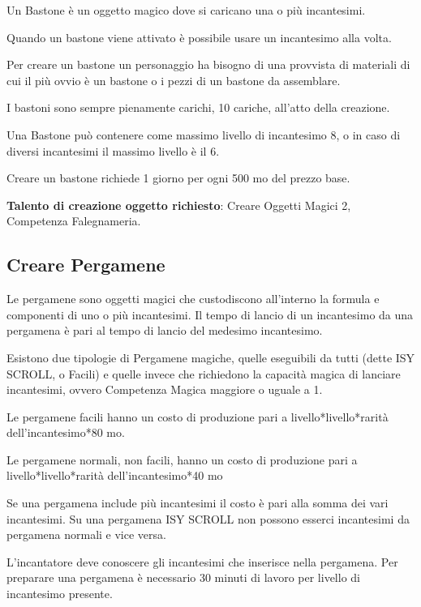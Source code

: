 \begin{multicols}{2}
\bigskip

Un Bastone è un oggetto magico dove si caricano una o più incantesimi.

Quando un bastone viene attivato è possibile usare un incantesimo alla volta.

Per creare un bastone un personaggio ha bisogno di una provvista di materiali di cui il più ovvio è un bastone o i pezzi di un bastone da assemblare.

I bastoni sono sempre pienamente carichi, 10 cariche, all'atto della creazione.

Una Bastone può contenere come massimo livello di incantesimo 8, o in caso di diversi incantesimi il massimo livello è il 6.

Creare un bastone richiede 1 giorno per ogni 500 mo del prezzo base.

\medskip

\textbf{Talento di creazione oggetto richiesto}: Creare Oggetti Magici 2, Competenza Falegnameria.

\subsection{Creare Pergamene}
\label{crearepergamene}\hypertarget{crearepergamene}{}

Le pergamene sono oggetti magici che custodiscono all'interno la formula e componenti di uno o più incantesimi. Il tempo di lancio di un incantesimo da una pergamena è pari al tempo di lancio del medesimo incantesimo.

Esistono due tipologie di Pergamene magiche, quelle eseguibili da tutti (dette ISY SCROLL, o Facili) e quelle invece che richiedono la capacità magica di lanciare incantesimi, ovvero Competenza Magica maggiore o uguale a 1.

Le pergamene facili hanno un costo di produzione pari a livello*livello*rarità dell'incantesimo*80 mo.

Le pergamene normali, non facili, hanno un costo di produzione pari a livello*livello*rarità dell'incantesimo*40 mo

Se una pergamena include più incantesimi il costo è pari alla somma dei vari incantesimi. Su una pergamena ISY SCROLL non possono esserci incantesimi da pergamena normali e vice versa.

L'incantatore deve conoscere gli incantesimi che inserisce nella pergamena. Per preparare una pergamena è necessario 30 minuti di lavoro per livello di incantesimo presente.


\end{multicols}
